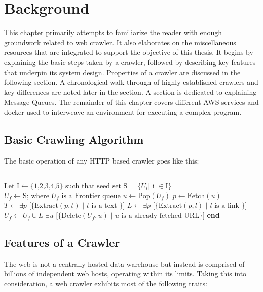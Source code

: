 \chapter{Background}
This chapter primarily attempts to familiarize the reader with enough groundwork related to web crawler. It
also elaborates on the miscellaneous resources that are integrated to support the objective of this thesis.
It begins by explaining the basic steps taken by a crawler, followed by describing key features that
underpin its system design. Properties of a crawler are discussed in the following section. A
chronological walk through of highly established crawlers and key differences are noted later in the
section. A section is dedicated to explaining Message Queues. The remainder of this chapter covers
different AWS services and docker used to interweave an environment for executing a complex program.


\section{Basic Crawling Algorithm}
The basic operation of any HTTP based crawler goes like this:
\\
\\
\begin{algorithm}
\begin{algorithmic}[1]
  \State $\text{Let I} \gets \text{\{1,2,3,4,5\}} \text{ such that seed set S = \{} U_i \text{| i } \in \text{I\}}$
  \State $U_f \gets \text{S; where } U_f \text{ is a Frontier queue}$
    \State $u \gets \text{Pop}(U_f)$ 
    \State $p \gets \text{Fetch}(u)$
    \State $T \gets \exists p\text{ [\{Extract}(p, t) \text{ | } t \text{ is a text \}]}$
    \State $L \gets \exists p\text{ [\{Extract}(p, l) \text{ | } l \text{ is a link \}]}$
    \State $U_f \gets U_f \cup L$
    \State $\exists u\text{ [\{Delete}(U_f, u) \text{ | } u \text{ is a already fetched URL\}]}$
  \EndWhile
\EndProcedure
\State \textbf{end}
\end{algorithmic}
\end{algorithm}

\pagebreak

\section{Features of a Crawler}
The web is not a centrally hosted data warehouse but instead is comprised of billions of independent
web hosts, operating within its limits. Taking this into consideration, a web crawler exhibits most of the
following traits:

